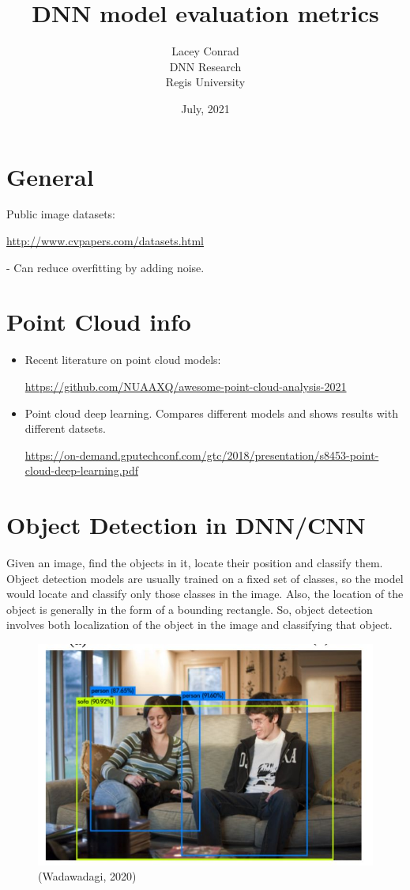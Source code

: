 \documentclass[]{article}
\title{DNN model evaluation metrics}
\author{Lacey Conrad\\DNN Research\\ Regis University}
\date{July, 2021}
\begin{document}
	\maketitle
\section{General}

Public image datasets:

\url{http://www.cvpapers.com/datasets.html}

- Can reduce overfitting by adding noise.

\section{Point Cloud info}
\begin{itemize}
	\item Recent literature on point cloud models:
	
	\url{https://github.com/NUAAXQ/awesome-point-cloud-analysis-2021}
	
	\item Point cloud deep learning.  Compares different models and shows results with different datsets.
	
	\url{https://on-demand.gputechconf.com/gtc/2018/presentation/s8453-point-cloud-deep-learning.pdf}
\end{itemize}



\section{Object Detection in DNN/CNN} 
Given an image, find the objects in it, locate their position and classify them.
Object detection models are usually trained on a fixed set of classes, so the model would locate and classify only those classes in the image.
Also, the location of the object is generally in the form of a bounding rectangle.
So, object detection involves both localization of the object in the image and classifying that object.
\begin{figure}[!h]
	\includegraphics[scale=0.95]{bounding_boxes}
	\caption{(Wadawadagi, 2020)}
	\label{Fig:Race}
\end{figure}
\end{document}
